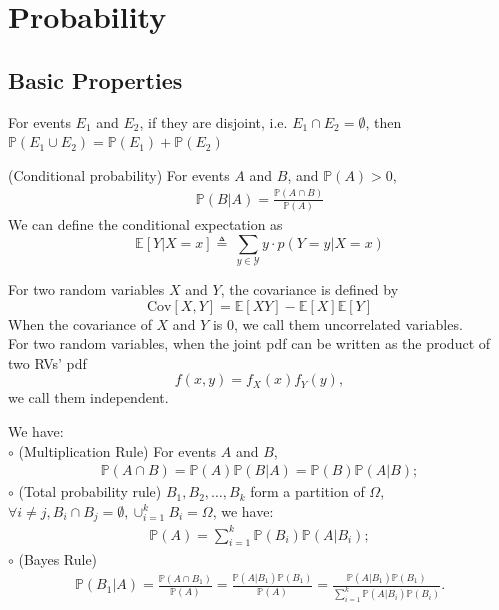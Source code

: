 \documentclass[10pt]{article}
\begin{document}
\section{Probability}
\subsection{Basic Properties}

For events $E_1$ and $E_2$, if they are disjoint, i.e. $E_1 \cap E_2 = \emptyset$, then $\mathbb{P}(E_1 \cup E_2) = \mathbb{P}(E_1) + \mathbb{P}(E_2)$\\
\begin{definition}(Conditional probability) For events $A$ and $B$, and $\mathbb{P}(A)>0$,
\begin{align*}
    \mathbb{P}(B|A) = \frac{\mathbb{P}(A \cap B)}{\mathbb{P}(A)}
\end{align*}
	We can define the conditional expectation as 
	\begin{equation*}
	\mathbb{E}\left[Y|X=x\right] \triangleq\ \sum_{y\in \mathcal{Y}}y \cdot p\left(Y=y|X=x\right)
	\end{equation*}
\end{definition}
For two random variables $X$ and $Y$, the covariance is defined by
	\begin{equation*}
	\mathrm{Cov}\left[X,Y\right]=\mathbb{E}\left[XY\right]-\mathbb{E}\left[X\right]\mathbb{E}\left[Y\right]
	\end{equation*}
	When the covariance of $X$ and $Y$ is $0$, we call them uncorrelated variables.\\
	For two random variables, when the joint pdf can be written as the product of two RVs' pdf
	\begin{equation*}
	f\left(x,y\right)=f_X\left(x\right)f_Y\left(y\right),
	\end{equation*} 
	we call them independent.\\
\begin{theorem} We have:\\
$\circ$ (Multiplication Rule) For events $A$ and $B$,
\begin{align*}
\mathbb{P}(A \cap B) = \mathbb{P}(A)\mathbb{P}(B|A) = \mathbb{P}(B)\mathbb{P}(A|B);
\end{align*}
$\circ$ (Total probability rule) $B_1,B_2,\dots,B_k$ form a partition of $\Omega$, $\forall i \neq j, B_i\cap B_j = \emptyset, \cup^{k}_{i = 1} B_i = \Omega$, we have:
\begin{align*}
\mathbb{P}(A) = \sum_{i=1}^{k} \mathbb{P}(B_i)\mathbb{P}(A|B_i);
\end{align*}
$\circ$ (Bayes Rule)
\begin{align*}
\mathbb{P}(B_1|A) = \frac{\mathbb{P}(A \cap B_1)}{\mathbb{P}(A)}=\frac{\mathbb{P}(A | B_1)\mathbb{P}(B_1)}{\mathbb{P}(A)} = \frac{\mathbb{P}(A | B_1)\mathbb{P}(B_1)}{\sum\limits_{i=1}^k \mathbb{P}(A | B_i)\mathbb{P}(B_i)}.
\end{align*}
\end{theorem}
\end{document}
